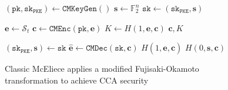 \documentclass[runningheads]{llncs}
\newcommand{\pke}{\texttt{PKE}}
\newcommand{\pk}{\texttt{pk}}
\newcommand{\sk}{\texttt{sk}}
\begin{document}
\begin{figure}[h]
    \centering

    \begin{minipage}[t]{0.34\textwidth}
        \centering
        \begin{algorithm}[H]
            \caption*{$\texttt{CMKEM.keygen}()$}
            \begin{algorithmic}[1]
                \State $(\pk, \sk_\pke) \leftarrow \texttt{CMKeyGen}()$
                \State $\mathbf{s} \leftarrow \mathbb{F}_2^n$
                \State $\sk \leftarrow (\sk_\pke, \mathbf{s})$
            \end{algorithmic}
        \end{algorithm}
    \end{minipage}\hfill
    \begin{minipage}[t]{0.25\textwidth}
        \centering
        \begin{algorithm}[H]
            \caption*{$\texttt{CMKEM.enc}(\pk)$}
            \begin{algorithmic}[1]
                \State $\mathbf{e} \leftarrow \mathcal{S}_t$
                \State $\mathbf{c} \leftarrow \texttt{CMEnc}(\pk, \mathbf{e})$
                \State $K \leftarrow H(1, \mathbf{e}, \mathbf{c})$
                \State \Return $\mathbf{c}, K$
            \end{algorithmic}
        \end{algorithm}
    \end{minipage}\hfill
    \begin{minipage}[t]{0.35\textwidth}
        \centering
        \begin{algorithm}[H]
            \caption*{$\texttt{CMKEM.dec}(\sk, \mathbf{c})$}
            \begin{algorithmic}[1]
                \State $(\sk_\pke, \mathbf{s}) \leftarrow \sk$
                \State $\hat{\mathbf{e}} \leftarrow \texttt{CMDec}(\sk, \mathbf{c})$
                \If{$\texttt{Synd}(\sk, \hat{\mathbf{e}}) = \mathbf{c}$}
                    \State \Return $H(1, \hat{\mathbf{e}}, \mathbf{c})$
                \Else
                    \State \Return $H(0, \mathbf{s}, \mathbf{c})$
                \EndIf
            \end{algorithmic}
        \end{algorithm}
    \end{minipage}

    \caption{Classic McEliece applies a modified Fujisaki-Okamoto transformation to achieve CCA security}\label{fig:mceliece-kem}
\end{figure}
\end{document}
